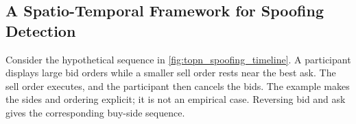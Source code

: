 \documentclass[11pt]{article}
\begin{document}

\subsection{A Spatio-Temporal Framework for Spoofing Detection}
\label{sec:spoofer_timeline}

Consider the hypothetical sequence in \cref{fig:topn_spoofing_timeline}. A participant displays large bid orders while a smaller sell order rests near the best ask. The sell order executes, and the participant then cancels the bids. The example makes the sides and ordering explicit; it is not an empirical case. Reversing bid and ask gives the corresponding buy-side sequence.
\end{document}
